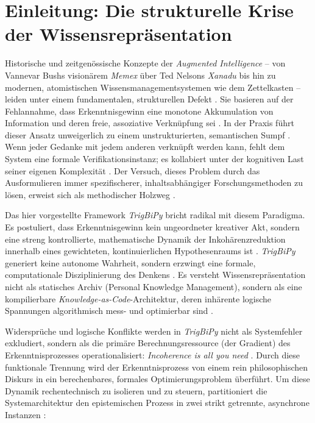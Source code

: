 \documentclass[11pt, a4paper]{article}
\begin{document}
	\section{Einleitung: Die strukturelle Krise der Wissensrepräsentation}
	
	Historische und zeitgenössische Konzepte der \emph{Augmented Intelligence} – von Vannevar Bushs visionärem \emph{Memex} über Ted Nelsons \emph{Xanadu} bis hin zu modernen, atomistischen Wissensmanagementsystemen wie dem Zettelkasten – leiden unter einem fundamentalen, strukturellen Defekt \cite{241}. Sie basieren auf der Fehlannahme, dass Erkenntnisgewinn eine monotone Akkumulation von Information und deren freie, assoziative Verknüpfung sei \cite{241, 242, 390}. In der Praxis führt dieser Ansatz unweigerlich zu einem unstrukturierten, semantischen Sumpf \cite{242}. Wenn jeder Gedanke mit jedem anderen verknüpft werden kann, fehlt dem System eine formale Verifikationsinstanz; es kollabiert unter der kognitiven Last seiner eigenen Komplexität \cite{241, 242}. Der Versuch, dieses Problem durch das Ausformulieren immer spezifischerer, inhaltsabhängiger Forschungsmethoden zu lösen, erweist sich als methodischer Holzweg \cite{243}.
	
	Das hier vorgestellte Framework \emph{TrigBiPy} bricht radikal mit diesem Paradigma. Es postuliert, dass Erkenntnisgewinn kein ungeordneter kreativer Akt, sondern eine streng kontrollierte, mathematische Dynamik der Inkohärenzreduktion innerhalb eines gewichteten, kontinuierlichen Hypothesenraums ist \cite{235, 237, 244}. \emph{TrigBiPy} generiert keine autonome Wahrheit, sondern erzwingt eine formale, computationale Disziplinierung des Denkens \cite{245, 411}. Es versteht Wissensrepräsentation nicht als statisches Archiv (Personal Knowledge Management), sondern als eine kompilierbare \emph{Knowledge-as-Code}-Architektur, deren inhärente logische Spannungen algorithmisch mess- und optimierbar sind \cite{235, 238, 396, 428}. 
	
	Widersprüche und logische Konflikte werden in \emph{TrigBiPy} nicht als Systemfehler exkludiert, sondern als die primäre Berechnungsressource (der Gradient) des Erkenntnisprozesses operationalisiert: \emph{Incoherence is all you need} \cite{238, 397, 398, 441}. Durch diese funktionale Trennung wird der Erkenntnisprozess von einem rein philosophischen Diskurs in ein berechenbares, formales Optimierungsproblem überführt. Um diese Dynamik rechentechnisch zu isolieren und zu steuern, partitioniert die Systemarchitektur den epistemischen Prozess in zwei strikt getrennte, asynchrone Instanzen \cite{246}:
	
\end{document}
